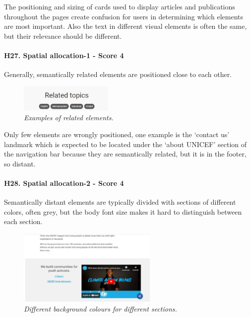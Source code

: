 \newline The positioning and sizing of cards used to display articles and publications throughout the pages create confusion for users in determining which elements are most important.
\newline Also the text in different visual elements is often the same, but their relevance should be different.
\newline
\newline \paragraph{H27. Spatial allocation-1 - Score 4} \label{subsec:H27}	Generally, semantically related elements are positioned close to each other.
\begin{figure}[!h]
	\begin{center}
		\includegraphics[width=0.4\textwidth]{FinalScores30.jpg}
		\captionsetup{font=small}
		\caption{\textit{Examples of related elements.}}
	\end{center}
\end{figure}
\newline Only few elements are wrongly positioned, one example is the ‘contact us’ landmark which is expected to be located under the ‘about UNICEF’ section of the navigation bar because they are semantically related, but it is in the footer, so distant.
\newline
\newline \paragraph{H28. Spatial allocation-2 - Score 4} \label{subsec:H28}	Semantically distant elements are typically divided with sections of different colors, often grey, but the body font size makes it hard to distinguish between each section. 
\begin{figure}[!h]
	\begin{center}
		\includegraphics[width=0.6\textwidth]{FinalScores31.jpg}
		\captionsetup{font=small}
		\caption{\textit{Different background colours for different sections.}}
	\end{center}
\end{figure}
